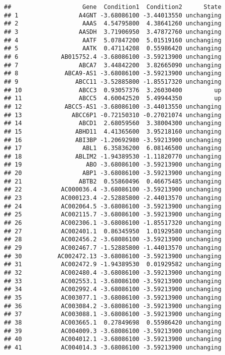 \documentclass[]{article}
\begin{document}
\begin{verbatim}
##                    Gene  Condition1  Condition2      State
## 1                 A4GNT -3.68086100 -3.44013550 unchanging
## 2                  AAAS  4.54795800  4.38641260 unchanging
## 3                 AASDH  3.71906950  3.47872760 unchanging
## 4                  AATF  5.07847200  5.01519160 unchanging
## 5                  AATK  0.47114208  0.55986420 unchanging
## 6            AB015752.4 -3.68086100 -3.59213900 unchanging
## 7                 ABCA7  3.44842200  3.82665090 unchanging
## 8             ABCA9-AS1 -3.68086100 -3.59213900 unchanging
## 9                ABCC11 -3.52885800 -1.85517320 unchanging
## 10                ABCC3  0.93057376  3.26030400         up
## 11                ABCC5  4.60042520  5.49944350         up
## 12            ABCC5-AS1 -3.68086100 -3.44013550 unchanging
## 13              ABCC6P1 -0.72150310 -0.27021074 unchanging
## 14                ABCD1  2.68059560  3.38004300 unchanging
## 15               ABHD11  4.41365600  3.95218160 unchanging
## 16               ABI3BP -1.20692980 -3.59213900 unchanging
## 17                 ABL1  6.35836200  6.08146500 unchanging
## 18               ABLIM2 -1.94389530 -1.11820770 unchanging
## 19                  ABO -3.68086100 -3.59213900 unchanging
## 20                 ABP1 -3.68086100 -3.59213900 unchanging
## 21                ABTB2  0.55860496  0.46675485 unchanging
## 22           AC000036.4 -3.68086100 -3.59213900 unchanging
## 23           AC000123.4 -2.52885800 -2.44013570 unchanging
## 24           AC002064.5 -3.68086100 -3.59213900 unchanging
## 25           AC002115.7 -3.68086100 -3.59213900 unchanging
## 26           AC002306.1 -3.68086100 -1.85517320 unchanging
## 27           AC002401.1  0.86345950  1.01929580 unchanging
## 28           AC002456.2 -3.68086100 -3.59213900 unchanging
## 29           AC002467.7 -1.52885800 -1.44013570 unchanging
## 30          AC002472.13 -3.68086100 -3.59213900 unchanging
## 31           AC002472.9 -1.94389530  0.01929582 unchanging
## 32           AC002480.4 -3.68086100 -3.59213900 unchanging
## 33           AC002553.1 -3.68086100 -3.59213900 unchanging
## 34           AC002992.4 -3.68086100 -3.59213900 unchanging
## 35           AC003077.1 -3.68086100 -3.59213900 unchanging
## 36           AC003084.2 -3.68086100 -3.59213900 unchanging
## 37           AC003088.1 -3.68086100 -3.59213900 unchanging
## 38           AC003665.1  0.27849698  0.55986420 unchanging
## 39           AC004009.3 -3.68086100 -3.59213900 unchanging
## 40           AC004012.1 -3.68086100 -3.59213900 unchanging
## 41           AC004014.3 -3.68086100 -3.59213900 unchanging

\end{verbatim}
\end{document}
